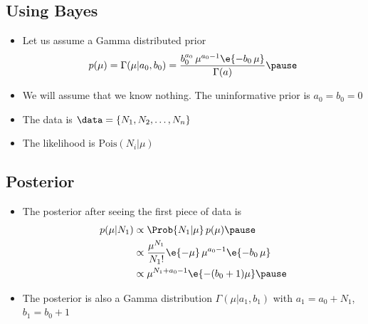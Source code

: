 
\begin{slide}
\section{Using Bayes}

\begin{PauseHighLight}
  \begin{itemize}
  \item Let us assume a Gamma distributed prior
    \begin{align*}
      p(\mu) = \Gamma(\mu|a_0,b_0) =
      \frac{b_0^{a_0}\, \mu^{a_0-1} \e{-b_0\,\mu}}{\Gamma(a)}\pause
    \end{align*}
  \item We will assume that we know nothing.  The uninformative prior is
    $a_0=b_0=0$\pause
  \item The data is $\data=\{N_1, N_2, \ldots, N_n\}$\pause
  \item The likelihood is $\mathrm{Pois}(N_i|\mu)$\pause
  \end{itemize}
\end{PauseHighLight}

\end{slide}


\begin{slide}
\section{Posterior}

\begin{PauseHighLight}
  \begin{itemize}
  \item The posterior after seeing the first piece of data is
    \begin{align*}
      p(\mu|N_1) &\propto \Prob{N_1|\mu}\, p(\mu) \pause
      \\
      &\propto \frac{\mu^{N_1}}{N_1!} \e{-\mu} \, \mu^{a_0-1} \e{-b_0\,\mu}
      \\
      &\propto \mu^{N_1+a_0-1} \e{-(b_0+1)\mu}\pause
    \end{align*}
  \item The posterior is also a Gamma distribution
    $\Gamma(\mu|a_1,b_1)$ with $a_1=a_0+N_1$, $b_1=b_0+1$\pause
  \end{itemize}
\end{PauseHighLight}

\end{slide}

